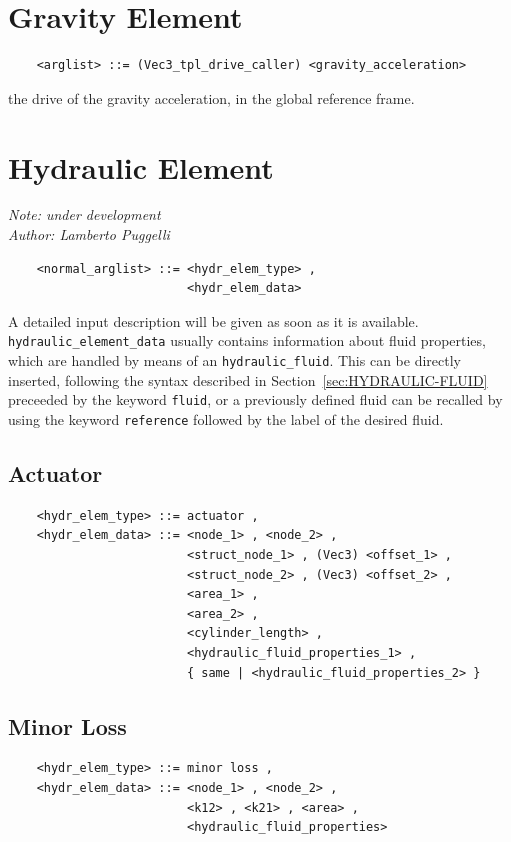 \documentclass[10pt,dvips]{report}
\begin{document}
\section{Gravity Element}
\begin{verbatim}
    <arglist> ::= (Vec3_tpl_drive_caller) <gravity_acceleration>
\end{verbatim}
the drive of the gravity acceleration, in the global reference frame.




\section{Hydraulic Element}\label{sec:HYDRAULIC-ELEMENT}
{\em 
    Note: under development \\
    Author: Lamberto Puggelli
}
\begin{verbatim}
    <normal_arglist> ::= <hydr_elem_type> , 
                         <hydr_elem_data>
\end{verbatim}
A detailed input description will be given as soon as it is available. \\
{\tt hydraulic\_element\_data} usually contains information about fluid
properties, which are handled by means of an {\tt hydraulic\_fluid}.
This can be directly inserted, following the syntax described in
Section~\ref{sec:HYDRAULIC-FLUID} preceeded by the keyword {\tt fluid}, or a
previously defined fluid can be recalled by using the keyword 
{\tt reference} followed by the label of the desired fluid.

\subsection{Actuator}
\begin{verbatim}
    <hydr_elem_type> ::= actuator ,
    <hydr_elem_data> ::= <node_1> , <node_2> , 
                         <struct_node_1> , (Vec3) <offset_1> ,
                         <struct_node_2> , (Vec3) <offset_2> ,
                         <area_1> ,
                         <area_2> ,
                         <cylinder_length> ,
                         <hydraulic_fluid_properties_1> ,
                         { same | <hydraulic_fluid_properties_2> }
\end{verbatim}

\subsection{Minor Loss}
\begin{verbatim}
    <hydr_elem_type> ::= minor loss ,
    <hydr_elem_data> ::= <node_1> , <node_2> ,
                         <k12> , <k21> , <area> ,
                         <hydraulic_fluid_properties>
\end{verbatim}
\end{document}
